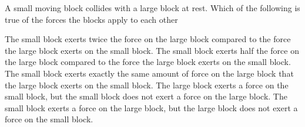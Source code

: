\documentclass{../../../oss-ap12ibhl}
\begin{document}
\genheader


\begin{questions}
  \question A small moving block collides with a large block at rest. Which of
  the following is true of the forces the blocks apply to each other
  \begin{choices}
    \choice The small block exerts twice the force on the large block
    compared to the force the large block exerts on the small block.
    \choice The small block exerts half the force on the large block compared
    to the force the large block exerts on the small block.
    \choice The small block exerts exactly the same amount of force on the
    large block that the large block exerts on the small block.
    \choice The large block exerts a force on the small block, but the small
    block does not exert a force on the large block.
    \choice The small block exerts a force on the large block, but the large
    block does not exert a force on the small block.
  \end{choices}
  \vspace{.7in}
  

%
%  
%  

\end{questions}
\end{document}
